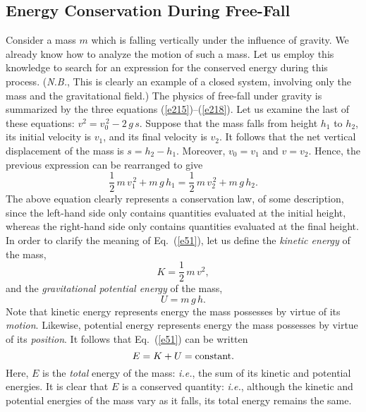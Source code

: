 \subsection{Energy Conservation During Free-Fall}
Consider a mass $m$ which is falling vertically under the influence of gravity.
We already know how to analyze the motion of such a mass. Let us employ this knowledge to
search for
an expression for the conserved energy during  this process. ({\em N.B.}, This is
clearly an example of a closed system, involving only the mass and the gravitational
field.)
The physics of
free-fall under gravity is summarized by the three equations (\ref{e215})--(\ref{e218}).
Let us examine the last of these equations: $v^2 = v_0^{\,2} - 2\,g\,s$.
Suppose that the mass falls from height $h_1$ to $h_2$,  its initial velocity
is $v_1$, and its final velocity is $v_2$. It follows that the net vertical displacement of the
mass is $s=h_2-h_1$. Moreover, $v_0=v_1$ and $v=v_2$. Hence, the previous expression
can be rearranged to give
\begin{equation}\label{e51}
\frac{1}{2}\,m\,v_1^{\,2} + m\,g\,h_1 = \frac{1}{2}\,m\,v_2^{\,2} + m\,g\,h_2.
\end{equation}
The above equation clearly represents a conservation law, of some description,
since the left-hand side only contains quantities evaluated at the initial height,
whereas the right-hand side only contains quantities evaluated at the final height. 
In order to clarify the meaning of Eq.~(\ref{e51}), let us define the
{\em kinetic energy} of the mass,
\begin{equation}\label{e52}
K = \frac{1}{2}\,m\,v^2,
\end{equation}
and the {\em gravitational potential energy} of the mass,
\begin{equation}
U = m\,g\,h.\label{e53}
\end{equation}
Note that kinetic energy represents energy the mass possesses by virtue of
its {\em motion}. Likewise, potential energy represents energy the mass
possesses by virtue of its {\em position}. 
It follows that Eq.~(\ref{e51}) can be written
\begin{equation}
E = K+ U= {\rm constant}.
\end{equation}
Here, $E$ is the {\em total} energy of the mass: {\em i.e.}, the sum of its
kinetic and potential energies. It is clear that $E$ is a conserved quantity:
{\em i.e.}, although the kinetic and potential energies of the mass vary
as it falls, its total energy  remains the same.


